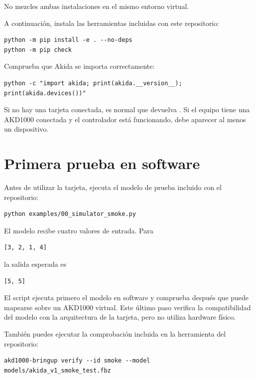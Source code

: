 No mezcles ambas instalaciones en el mismo entorno virtual.

A continuación, instala las herramientas incluidas con este repositorio:

\begin{lstlisting}
python -m pip install -e . --no-deps
python -m pip check
\end{lstlisting}

Comprueba que Akida se importa correctamente:

\begin{lstlisting}
python -c "import akida; print(akida.__version__); print(akida.devices())"
\end{lstlisting}

Si no hay una tarjeta conectada, es normal que  devuelva
\code{[]}. Si el equipo tiene una AKD1000 conectada y el controlador está funcionando,
debe aparecer al menos un dispositivo.

\section{Primera prueba en software}

Antes de utilizar la tarjeta, ejecuta el modelo de prueba incluido con el repositorio:

\begin{lstlisting}
python examples/00_simulator_smoke.py
\end{lstlisting}

El modelo recibe cuatro valores de entrada. Para

\begin{lstlisting}
[3, 2, 1, 4]
\end{lstlisting}

la salida esperada es

\begin{lstlisting}
[5, 5]
\end{lstlisting}

El script ejecuta primero el modelo en software y comprueba después que puede mapearse
sobre un AKD1000 virtual. Este último paso verifica la compatibilidad del modelo con la
arquitectura de la tarjeta, pero no utiliza hardware físico.

También puedes ejecutar la comprobación incluida en la herramienta del repositorio:

\begin{lstlisting}
akd1000-bringup verify --id smoke --model models/akida_v1_smoke_test.fbz
\end{lstlisting}

